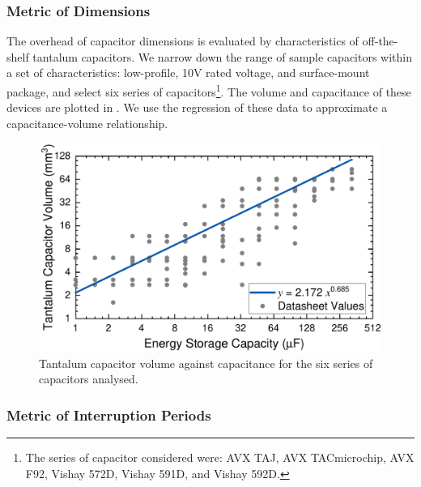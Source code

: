 \subsubsection{Metric of Dimensions}

The overhead of capacitor dimensions is evaluated by characteristics of off-the-shelf tantalum capacitors. 
We narrow down the range of sample capacitors within a set of characteristics: low-profile, 10V rated voltage, and surface-mount package, and select six series of capacitors\footnote{The series of capacitor considered were: AVX TAJ, AVX TACmicrochip, AVX F92, Vishay 572D, Vishay 591D, and Vishay 592D.}. 
The volume and capacitance of these devices are plotted in . 
We use the regression of these data to approximate a capacitance-volume relationship.

\begin{figure}
    \centering
    \includegraphics[width=\columnwidth]{ch4_sizingapproach/figures/CapVol2Fig2}
    \caption{Tantalum capacitor volume against capacitance for the six series of capacitors analysed. }
    \label{fig:capvol}
\end{figure}

\subsubsection{Metric of Interruption Periods} \label{subsubsec:metricintper}


